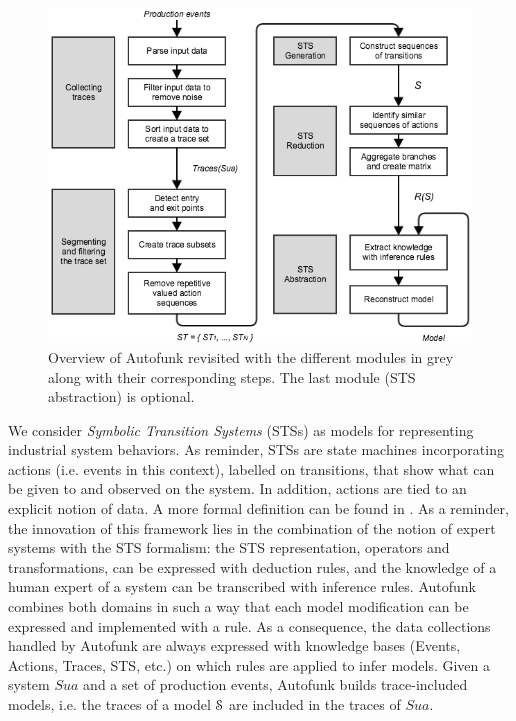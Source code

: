 \begin{figure}[ht]
    \includegraphics[width=1.0\linewidth]{figures/autofunk.png}

    \caption{Overview of Autofunk revisited with the different
    modules in grey along with their corresponding steps. The last
    module (STS abstraction) is optional.}
    \label{fig:prodsystems:autofunk-overview}
\end{figure}

We consider \textit{Symbolic Transition Systems} (STSs) as models
for representing industrial system behaviors. As reminder, STSs
are state machines incorporating actions (i.e. events in this
context), labelled on transitions, that show what can be given to
and observed on the system. In addition, actions are tied to an
explicit notion of data. A more formal definition can be found
in .
As a reminder, the innovation of this framework lies in the
combination of the notion of expert systems with the STS
formalism: the STS representation, operators and transformations,
can be expressed with deduction rules, and the knowledge of a
human expert of a system can be transcribed with inference rules.
Autofunk combines both domains in such a way that each model
modification can be expressed and implemented with a rule.  As a
consequence, the data collections handled by Autofunk are always
expressed with knowledge bases (Events, Actions, Traces, STS,
etc.) on which rules are applied to infer models. Given a system
$\mathit{Sua}$ and a set of production events, Autofunk builds
trace-included models, i.e. the traces of a model $\EuScript{S}$
are included in the traces of $\mathit{Sua}$.

